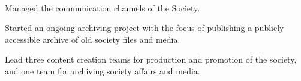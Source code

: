 \documentclass[]{hieudo-build}
\begin{document}
\begin{minipage}[t]{0.69\textwidth}
 \\
\begin{tightemize} 
\item Managed the communication channels of the Society.
\item Started an ongoing archiving project with the focus of publishing a publicly accessible archive of old society files and media.
\item Lead three content creation teams for production and promotion of the society, and one team for archiving society affairs and media.
\end{tightemize}
\sectionsep





\end{minipage}
\end{document}
